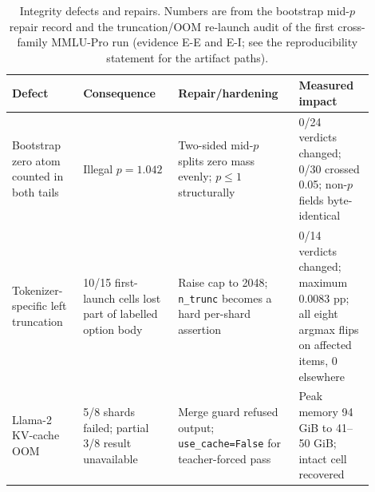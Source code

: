 \begin{table}[t]
\centering
\small
\setlength{\tabcolsep}{4.2pt}
\begin{tabular}{p{0.18\linewidth}p{0.24\linewidth}p{0.29\linewidth}p{0.19\linewidth}}
\toprule
Defect & Consequence & Repair/hardening & Measured impact \\
\midrule
Bootstrap zero atom counted in both tails & Illegal $p=1.042$ & Two-sided mid-$p$ splits zero mass evenly; $p\leq1$ structurally & 0/24 verdicts changed; 0/30 crossed 0.05; non-$p$ fields byte-identical \\
Tokenizer-specific left truncation & 10/15 first-launch cells lost part of labelled option body & Raise cap to 2048; \texttt{n\_trunc} becomes a hard per-shard assertion & 0/14 verdicts changed; maximum 0.0083 pp; all eight argmax flips on affected items, 0 elsewhere \\
Llama-2 KV-cache OOM & 5/8 shards failed; partial 3/8 result unavailable & Merge guard refused output; \texttt{use\_cache=False} for teacher-forced pass & Peak memory 94 GiB to 41--50 GiB; intact cell recovered \\
\bottomrule
\end{tabular}
\caption{Integrity defects and repairs. Numbers are from the bootstrap mid-$p$ repair record and the truncation/OOM re-launch audit of the first cross-family MMLU-Pro run (evidence \textsf{E-E} and \textsf{E-I}; see the reproducibility statement for the artifact paths).}
\label{tab:integrity}
\end{table}
